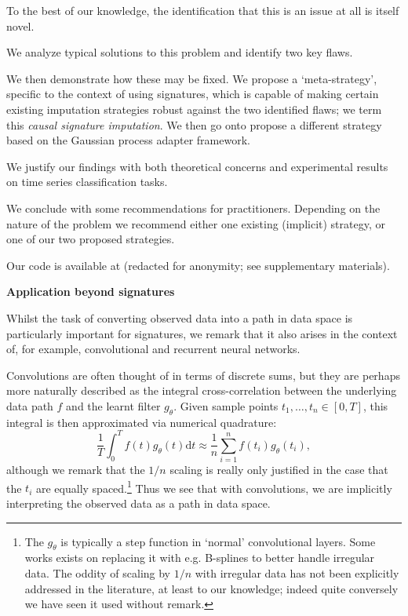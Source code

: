 \documentclass{article}
\renewcommand{\subsubsection}[1]{\textbf{#1}

} %
\begin{document}
To the best of our knowledge, the identification that this is an issue at all is itself novel.

We analyze typical solutions to this problem and identify two key flaws.

We then demonstrate how these may be fixed. We propose a `meta-strategy', specific to the context of using signatures, which is capable of making certain existing imputation strategies robust against the two identified flaws; we term this \emph{causal signature imputation}. We then go onto propose a different strategy based on the Gaussian process adapter framework.

We justify our findings with both theoretical concerns and experimental results on time series classification tasks.

We conclude with some recommendations for practitioners. Depending on the nature of the problem we recommend either one existing (implicit) strategy, or one of our two proposed strategies.

Our code is available at (redacted for anonymity; see supplementary materials).

\subsubsection{Application beyond signatures}

Whilst the task of converting observed data into a path in data space is particularly important for signatures, we remark that it also arises in the context of, for example, convolutional and recurrent neural networks.

Convolutions are often thought of in terms of discrete sums, but they are perhaps more naturally described as the integral cross-correlation between the underlying data path $f$ and the learnt filter $g_\theta$. Given sample points $t_1, \ldots, t_n \in [0, T]$, this integral is then approximated via numerical quadrature:
\begin{equation*}
    \frac{1}{T}\int_0^T f(t) g_\theta(t) \mathrm{d}t \approx \frac{1}{n}\sum_{i = 1}^n f(t_i) g_\theta(t_i),
\end{equation*}
although we remark that the $1/n$ scaling is really only justified in the case that the $t_i$ are equally spaced.\footnote{The $g_\theta$ is typically a step function in `normal' convolutional layers. Some works exists on replacing it with e.g. B-splines \cite{TODO} to better handle irregular data. The oddity of scaling by $1/n$ with irregular data has not been explicitly addressed in the literature, at least to our knowledge; indeed quite conversely we have seen it used without remark.} Thus we see that with convolutions, we are implicitly interpreting the observed data as a path in data space.
\end{document}
